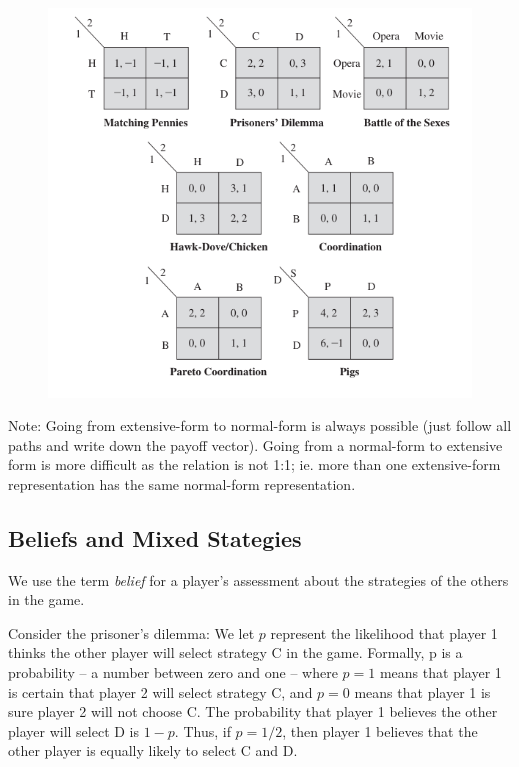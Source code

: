 \begin{figure}[H]
    \centering
    \includegraphics[scale=0.7]{images/2023-10-10-game_theory_04a.png}
\end{figure}

Note: Going from extensive-form to normal-form is always possible (just follow all paths and write down the payoff vector). Going from a normal-form to extensive form is more difficult as the relation is not 1:1; ie. more than one extensive-form representation has the same normal-form representation.


\subsection{Beliefs and Mixed Stategies}

We use the term \emph{belief} for a player’s assessment about the strategies of the others in the game.

Consider the prisoner's dilemma: We let $p$ represent the likelihood that player 1 thinks the other player will select strategy C in the game. Formally, p is a probability -- a number between zero and one -- where $p = 1$ means that player 1 is certain that player 2 will select strategy C, and $p = 0$ means that player 1 is sure player 2 will not choose C. The probability that player 1 believes the other player will select D is $1 - p$. Thus, if $p = 1/2$, then player 1 believes that the other player is equally likely to select C and D. 

